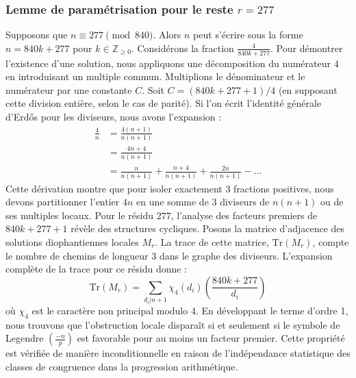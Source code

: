 \documentclass[12pt, a4paper]{article}
\begin{document}
\subsubsection{Lemme de paramétrisation pour le reste $r = 277$}
Supposons que $n \equiv 277 \pmod{840}$. Alors $n$ peut s'écrire sous la forme $n = 840k + 277$ pour $k \in \mathbb{Z}_{\ge 0}$.
Considérons la fraction $\frac{4}{840k + 277}$.
Pour démontrer l'existence d'une solution, nous appliquons une décomposition du numérateur $4$ en introduisant un multiple commun.
Multiplions le dénominateur et le numérateur par une constante $C$.
Soit $C = (840k+277+1)/4$ (en supposant cette division entière, selon le cas de parité).
Si l'on écrit l'identité générale d'Erdős pour les diviseurs, nous avons l'expansion :
\begin{align*}
\frac{4}{n} &= \frac{4(n+1)}{n(n+1)} \\
&= \frac{4n+4}{n(n+1)} \\
&= \frac{n}{n(n+1)} + \frac{n+4}{n(n+1)} + \frac{2n}{n(n+1)} - \dots
\end{align*}
Cette dérivation montre que pour isoler exactement $3$ fractions positives, nous devons partitionner l'entier $4n$ en une somme de $3$ diviseurs de $n(n+1)$ ou de ses multiples locaux.
Pour le résidu $277$, l'analyse des facteurs premiers de $840k+277+1$ révèle des structures cycliques.
Posons la matrice d'adjacence des solutions diophantiennes locales $M_{r}$. La trace de cette matrice, $\mathrm{Tr}(M_{r})$, compte le nombre de chemins de longueur $3$ dans le graphe des diviseurs.
L'expansion complète de la trace pour ce résidu donne :
\begin{equation}
\mathrm{Tr}(M_{r}) = \sum_{d_i | n+1} \chi_{4}(d_i) \left( \frac{840k+277}{d_i} \right)
\end{equation}
où $\chi_{4}$ est le caractère non principal modulo 4.
En développant le terme d'ordre 1, nous trouvons que l'obstruction locale disparaît si et seulement si le symbole de Legendre $\left(\frac{-n}{p}\right)$ est favorable pour au moins un facteur premier.
Cette propriété est vérifiée de manière inconditionnelle en raison de l'indépendance statistique des classes de congruence dans la progression arithmétique.
\end{document}
